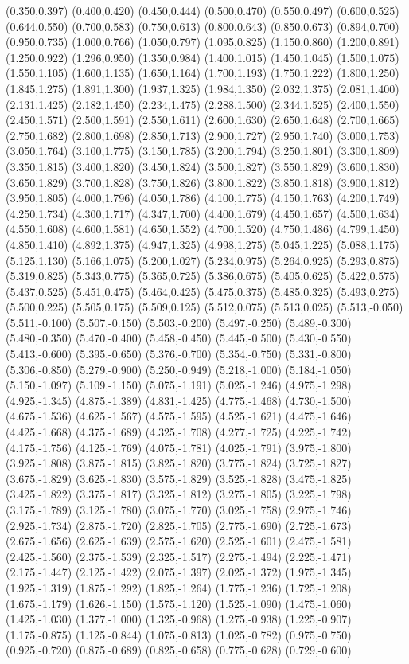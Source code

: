 (0.350,0.397) (0.400,0.420) (0.450,0.444) (0.500,0.470) (0.550,0.497) (0.600,0.525) (0.644,0.550) (0.700,0.583) (0.750,0.613) (0.800,0.643) (0.850,0.673) (0.894,0.700) (0.950,0.735) (1.000,0.766) (1.050,0.797) (1.095,0.825) (1.150,0.860) (1.200,0.891) (1.250,0.922) (1.296,0.950) (1.350,0.984) (1.400,1.015) (1.450,1.045) (1.500,1.075) (1.550,1.105) (1.600,1.135) (1.650,1.164) (1.700,1.193) (1.750,1.222) (1.800,1.250) (1.845,1.275) (1.891,1.300) (1.937,1.325) (1.984,1.350) (2.032,1.375) (2.081,1.400) (2.131,1.425) (2.182,1.450) (2.234,1.475) (2.288,1.500) (2.344,1.525) (2.400,1.550) (2.450,1.571) (2.500,1.591) (2.550,1.611) (2.600,1.630) (2.650,1.648) (2.700,1.665) (2.750,1.682) (2.800,1.698) (2.850,1.713) (2.900,1.727) (2.950,1.740) (3.000,1.753) (3.050,1.764) (3.100,1.775) (3.150,1.785) (3.200,1.794) (3.250,1.801) (3.300,1.809) (3.350,1.815) (3.400,1.820) (3.450,1.824) (3.500,1.827) (3.550,1.829) (3.600,1.830) (3.650,1.829) (3.700,1.828) (3.750,1.826) (3.800,1.822) (3.850,1.818) (3.900,1.812) (3.950,1.805) (4.000,1.796) (4.050,1.786) (4.100,1.775) (4.150,1.763) (4.200,1.749) (4.250,1.734) (4.300,1.717) (4.347,1.700) (4.400,1.679) (4.450,1.657) (4.500,1.634) (4.550,1.608) (4.600,1.581) (4.650,1.552) (4.700,1.520) (4.750,1.486) (4.799,1.450) (4.850,1.410) (4.892,1.375) (4.947,1.325) (4.998,1.275) (5.045,1.225) (5.088,1.175) (5.125,1.130) (5.166,1.075) (5.200,1.027) (5.234,0.975) (5.264,0.925) (5.293,0.875) (5.319,0.825) (5.343,0.775) (5.365,0.725) (5.386,0.675) (5.405,0.625) (5.422,0.575) (5.437,0.525) (5.451,0.475) (5.464,0.425) (5.475,0.375) (5.485,0.325) (5.493,0.275) (5.500,0.225) (5.505,0.175) (5.509,0.125) (5.512,0.075) (5.513,0.025) (5.513,-0.050) (5.511,-0.100) (5.507,-0.150) (5.503,-0.200) (5.497,-0.250) (5.489,-0.300) (5.480,-0.350) (5.470,-0.400) (5.458,-0.450) (5.445,-0.500) (5.430,-0.550) (5.413,-0.600) (5.395,-0.650) (5.376,-0.700) (5.354,-0.750) (5.331,-0.800) (5.306,-0.850) (5.279,-0.900) (5.250,-0.949) (5.218,-1.000) (5.184,-1.050) (5.150,-1.097) (5.109,-1.150) (5.075,-1.191) (5.025,-1.246) (4.975,-1.298) (4.925,-1.345) (4.875,-1.389) (4.831,-1.425) (4.775,-1.468) (4.730,-1.500) (4.675,-1.536) (4.625,-1.567) (4.575,-1.595) (4.525,-1.621) (4.475,-1.646) (4.425,-1.668) (4.375,-1.689) (4.325,-1.708) (4.277,-1.725) (4.225,-1.742) (4.175,-1.756) (4.125,-1.769) (4.075,-1.781) (4.025,-1.791) (3.975,-1.800) (3.925,-1.808) (3.875,-1.815) (3.825,-1.820) (3.775,-1.824) (3.725,-1.827) (3.675,-1.829) (3.625,-1.830) (3.575,-1.829) (3.525,-1.828) (3.475,-1.825) (3.425,-1.822) (3.375,-1.817) (3.325,-1.812) (3.275,-1.805) (3.225,-1.798) (3.175,-1.789) (3.125,-1.780) (3.075,-1.770) (3.025,-1.758) (2.975,-1.746) (2.925,-1.734) (2.875,-1.720) (2.825,-1.705) (2.775,-1.690) (2.725,-1.673) (2.675,-1.656) (2.625,-1.639) (2.575,-1.620) (2.525,-1.601) (2.475,-1.581) (2.425,-1.560) (2.375,-1.539) (2.325,-1.517) (2.275,-1.494) (2.225,-1.471) (2.175,-1.447) (2.125,-1.422) (2.075,-1.397) (2.025,-1.372) (1.975,-1.345) (1.925,-1.319) (1.875,-1.292) (1.825,-1.264) (1.775,-1.236) (1.725,-1.208) (1.675,-1.179) (1.626,-1.150) (1.575,-1.120) (1.525,-1.090) (1.475,-1.060) (1.425,-1.030) (1.377,-1.000) (1.325,-0.968) (1.275,-0.938) (1.225,-0.907) (1.175,-0.875) (1.125,-0.844) (1.075,-0.813) (1.025,-0.782) (0.975,-0.750) (0.925,-0.720) (0.875,-0.689) (0.825,-0.658) (0.775,-0.628) (0.729,-0.600) 